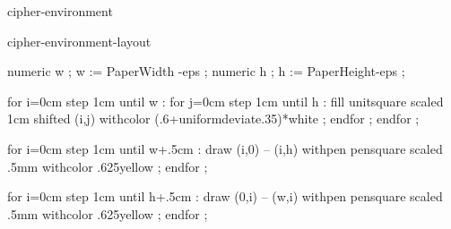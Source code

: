 
\startenvironment cipher-environment

\environment cipher-environment-layout


\usesymbols[mvs]
\setupsymbolset[martinvogel 2]


\mainlanguage[en]
\setuplanguage
  [en]
  [leftquotation=, rightquotation=]


\setuplabeltext[en][figure=图]
\setuplabeltext[en][table=表]
\setuplabeltext[en][chapter={第,章}]

\setupheadtext[en][figure=图]
\setupheadtext[en][table=表]
\setupheadtext[en][chapter={第,章}]

\setupexternalfigures[directory={figures}]
\usemodule[tikz]
\usemodule[pgffor]
\usemodule[pgfmath]



    numeric w ; w := PaperWidth -eps ; %
    numeric h ; h := PaperHeight-eps ; %

    for i=0cm step 1cm until w  :
        for j=0cm step 1cm until h :
            fill unitsquare scaled 1cm shifted (i,j) withcolor (.6+uniformdeviate.35)*white ;
        endfor ;
    endfor ;


    for i=0cm step 1cm until w+.5cm :
        draw (i,0) -- (i,h) withpen pensquare scaled .5mm withcolor .625yellow ;
    endfor ;

    for i=0cm step 1cm until h+.5cm :
        draw (0,i) -- (w,i) withpen pensquare scaled .5mm withcolor .625yellow ;
    endfor ;

